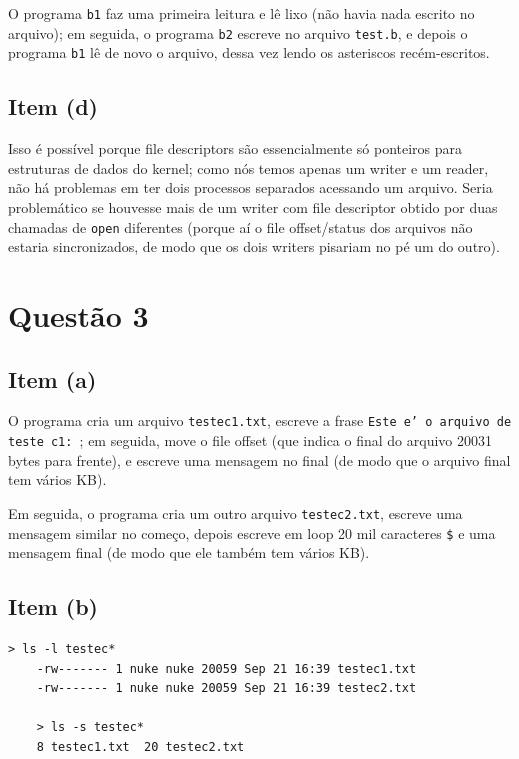 \documentclass{article}
\begin{document}
O programa \texttt{b1} faz uma primeira leitura e lê lixo (não havia nada escrito no arquivo); em seguida, o programa \texttt{b2} escreve no arquivo \texttt{test.b}, e depois o programa \texttt{b1} lê de novo o arquivo, dessa vez lendo os asteriscos recém-escritos.

\newpage
\subsection*{Item (d)}

Isso é possível porque file descriptors são essencialmente só ponteiros para estruturas de dados do kernel; como nós temos apenas um writer e um reader, não há problemas em ter dois processos separados acessando um arquivo. Seria problemático se houvesse mais de um writer com file descriptor obtido por duas chamadas de \texttt{open} diferentes (porque aí o file offset/status dos arquivos não estaria sincronizados, de modo que os dois writers pisariam no pé um do outro).

\newpage
\section*{Questão 3}

\subsection*{Item (a)}

O programa cria um arquivo \texttt{testec1.txt}, escreve a frase \texttt{Este e' o arquivo de teste c1: }; em seguida, move o file offset (que indica o final do arquivo 20031 bytes para frente), e escreve uma mensagem no final (de modo que o arquivo final tem vários KB).

Em seguida, o programa cria um outro arquivo \texttt{testec2.txt}, escreve uma mensagem similar no começo, depois escreve em loop 20 mil caracteres \texttt{\$} e uma mensagem final (de modo que ele também tem vários KB).

\subsection*{Item (b)}

\begin{lstlisting}[breaklines]
    > ls -l testec*
    -rw------- 1 nuke nuke 20059 Sep 21 16:39 testec1.txt
    -rw------- 1 nuke nuke 20059 Sep 21 16:39 testec2.txt

    > ls -s testec*
    8 testec1.txt  20 testec2.txt
\end{lstlisting}
\end{document}
